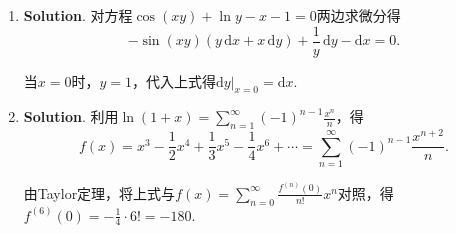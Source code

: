 \documentclass[../Main.tex]{subfiles}
\begin{document}
\begin{enumerate}
          当$x=0$时，
          \[
              \begin{aligned}
                  f'(0)= & \lim_{x\to0}\frac{(1+x^2)^{\frac{1}{\sin x}}-1}{x}=\lim_{x\to0}\frac{\mathrm{e}^{\frac{\ln(1+x^2)}{\sin x}}-1}{x} \\
                  =      & \lim_{x\to 0}\frac{\ln(1+x^2)}{x\sin x}=1.
              \end{aligned}
          \]

          综上所述，$f'(x)=
              \begin{cases}
                  (1+x^{2})^{\frac{1}{\sin x}}\cdot\left(\frac{2x}{(1+x^2)\sin x}-\frac{\ln(1+x^2)\cos x}{\sin^2 x}\right), & x\neq0, \\
                  1,                                                                                                        & x=0.
              \end{cases}$

    \item \textbf{Solution}. 对方程$\cos(xy)+\ln y - x - 1=0$两边求微分得
          \[
              -\sin(xy)(y\,\mathrm{d}x+x\,\mathrm{d}y)+\frac{1}{y}\,\mathrm{d}y-\mathrm{d}x=0
              .
          \]

          当$x=0$时，$y=1$，代入上式得$\left.\mathrm{d}y\right|_{x=0}=\mathrm{d}x$.

    \item \textbf{Solution}. 利用$\ln(1+x)=\sum_{n=1}^{\infty}(-1)^{n-1}\frac{x^{n}}{n}$，得
          \[
              f(x)=x^{3}-\frac{1}{2}x^{4}+\frac{1}{3}x^{5}-\frac{1}{4}x^{6}+\cdots=\sum
              _{n=1}^{\infty}(-1)^{n-1}\frac{x^{n+2}}{n}.
          \]

          由Taylor定理，将上式与$f(x)=\sum_{n=0}^{\infty}\frac{f^{(n)}(0)}{n!}x^{n}$对照，得$f
                  ^{(6)}(0)=-\frac{1}{4}\cdot 6!=-180.$
\end{enumerate}
\end{document}

